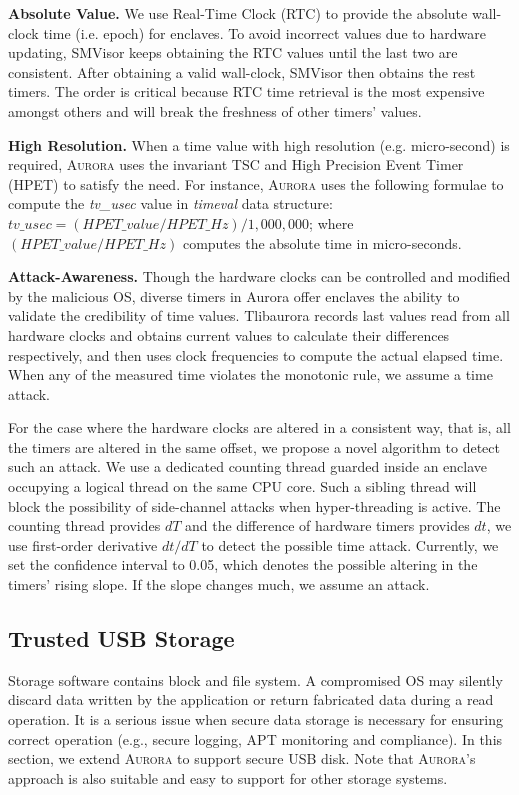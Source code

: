 \textbf{Absolute Value.}
We use Real-Time Clock (RTC) to provide the absolute wall-clock time (i.e. epoch) for enclaves. To avoid incorrect values due to hardware updating, SMVisor keeps obtaining the RTC values until the last two are consistent. After obtaining a valid wall-clock, SMVisor then obtains the rest timers. The order is critical because RTC time retrieval is the most expensive amongst others and will break the freshness of other timers' values.

\textbf{High Resolution.}
When a time value with high resolution (e.g. micro-second) is required, \textsc{Aurora} uses the invariant TSC and High Precision Event Timer (HPET) to satisfy the need. For instance, \textsc{Aurora} uses the following formulae to compute the \textit{tv\_usec} value in \textit{timeval} data structure: {$tv\_usec = (HPET\_value/ HPET\_Hz) / 1,000,000$;} where $(HPET\_value / HPET\_Hz)$ computes the absolute time in micro-seconds.

\textbf{Attack-Awareness.}
Though the hardware clocks can be controlled and modified by the malicious OS, diverse timers in Aurora offer enclaves the ability to validate the credibility of time values. Tlibaurora records last values read from all hardware clocks and obtains current values to calculate their differences respectively, and then uses clock frequencies to compute the actual elapsed time. When any of the measured time violates the monotonic rule, we assume a time attack.

For the case where the hardware clocks are altered in a consistent way, that is, all the timers are altered in the same offset, we propose a novel algorithm to detect such an attack. We use a dedicated counting thread \cite{DBLP:conf/dimva/SchwarzWGMM17} guarded inside an enclave occupying a logical thread on the same CPU core. Such a sibling thread will block the possibility of side-channel attacks when hyper-threading is active. The counting thread provides $dT$ and the difference of hardware timers provides $dt$, we use first-order derivative $dt/dT$ to detect the possible time attack. Currently, we set the confidence interval to 0.05, which denotes the possible altering in the timers' rising slope. If the slope changes much, we assume an attack.

\subsection{Trusted USB Storage}\label{storage_service}
Storage software contains block and file system. A compromised OS may silently discard data written by the application or return fabricated data during a read operation. It is a serious issue when secure data storage is  necessary for ensuring correct operation (e.g., secure logging, APT monitoring and compliance). In this section, we extend \textsc{Aurora} to support secure USB disk. Note that \textsc{Aurora}'s approach is also suitable and easy to support for other storage systems.

